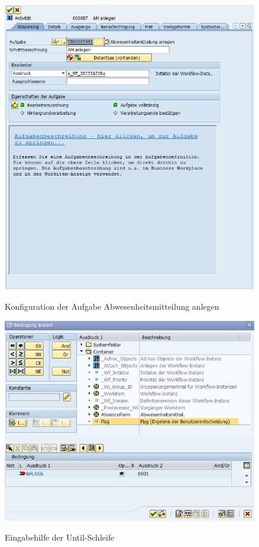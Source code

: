 \begin{figure}[H]
	\begin{center}
	\includegraphics[width=1.0\textwidth]{grafiken/wf-builder_bsp2_act_am-anlegen.png}
	\caption{Konfiguration der Aufgabe Abwesenheitsmitteilung anlegen}
	\vspace{-10pt}
	\label{abb:workflow-bsp2-act_am-anlegen}
	\end{center}
\end{figure}

\begin{figure}[H]
	\begin{center}
	\includegraphics[width=450px]{grafiken/wf-builder_bsp2_act_loop_inputhelp.png}
	\caption{Eingabehilfe der Until-Schleife}
	\vspace{-10pt}
	\label{abb:workflow-bsp2-act_loop_inputhelp}
	\end{center}
\end{figure}

